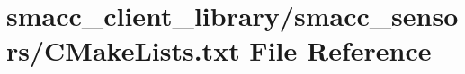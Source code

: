 \hypertarget{smacc__client__library_2smacc__sensors_2CMakeLists_8txt}{}\section{smacc\+\_\+client\+\_\+library/smacc\+\_\+sensors/\+C\+Make\+Lists.txt File Reference}
\label{smacc__client__library_2smacc__sensors_2CMakeLists_8txt}
